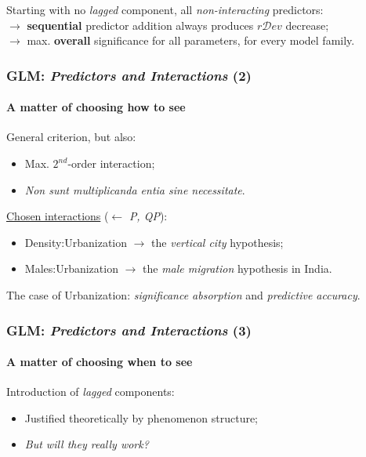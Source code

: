 \documentclass{beamer}
\begin{document}
{\begin{frame}
		\hfill

	Starting with no \textit{lagged} component, all \textit{non-interacting} predictors:\\
	$\rightarrow$ \textbf{sequential} predictor addition always produces $r\mathcal{D}ev$ decrease;\\
	$\rightarrow$ max. \textbf{overall} significance for all parameters, for every model family.
\end{frame}

\begin{frame}
	\frametitle{GLM: \textit{Predictors and Interactions} (2)}
	\framesubtitle{A matter of choosing \textbf{how} to see}

	General criterion, but also:
\begin{itemize}
	\item{Max. $2^{nd}$-order interaction;}
	\item{\textit{Non sunt multiplicanda entia sine necessitate}.}
\end{itemize}

	\hfill

	\underline{Chosen interactions} ($\leftarrow$ \textit{P, QP}):
	\begin{itemize}
		\item{\textsf{Density:Urbanization} $\rightarrow$ the \textit{vertical city} hypothesis;}
		\item{\textsf{Males:Urbanization} $\rightarrow$ the \textit{male migration} hypothesis in India}.
	\end{itemize}

	\hfill

	The case of \textsf{Urbanization}: \textit{significance absorption} and \textit{predictive accuracy}.

\end{frame}


\begin{frame}
	\frametitle{GLM: \textit{Predictors and Interactions} (3)}
	\framesubtitle{A matter of choosing \textbf{when} to see}

	Introduction of \textit{lagged} components:
	\begin{itemize}
		\item{Justified theoretically by phenomenon structure;}
		\item{\textit{But will they really work?}}
	\end{itemize}


\end{frame}}
\end{document}
